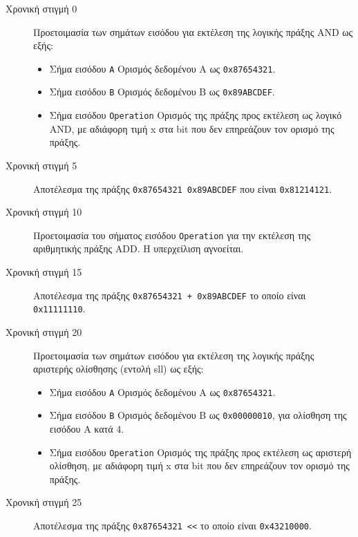 \documentclass[11pt]{extarticle}
\begin{document}
\begin{description}
\item[Χρονική στιγμή 0] \hfill \newline
Προετοιμασία των σημάτων εισόδου για εκτέλεση της λογικής πράξης AND ως εξής:
\begin{itemize}
    \item Σήμα εισόδου \texttt{Α} \newline Ορισμός δεδομένου Α ως \texttt{0x87654321}.
    \item Σήμα εισόδου \texttt{Β} \newline Ορισμός δεδομένου B ως \texttt{0x89ABCDEF}.
    \item Σήμα εισόδου \texttt{Operation} \newline Ορισμός της πράξης προς εκτέλεση ως λογικό AND, με αδιάφορη τιμή x στα bit που δεν επηρεάζουν τον ορισμό της πράξης.
\end{itemize}
\item[Χρονική στιγμή 5] \hfill \newline
Αποτέλεσμα της πράξης \texttt{0x87654321 \textampersand\space 0x89ABCDEF} που είναι \texttt{0x81214121}.
\item[Χρονική στιγμή 10] \hfill \newline
Προετοιμασία του σήματος εισόδου \texttt{Operation} για την εκτέλεση της αριθμητικής πράξης ADD. Η υπερχείλιση αγνοείται.
\item[Χρονική στιγμή 15] \hfill \newline
Αποτέλεσμα της πράξης \texttt{0x87654321 + 0x89ABCDEF} το οποίο είναι \texttt{0x11111110}.
\newpage
\item[Χρονική στιγμή 20] \hfill \newline
Προετοιμασία των σημάτων εισόδου για εκτέλεση της λογικής πράξης αριστερής ολίσθησης (εντολή sll) ως εξής:
\begin{itemize}
    \item Σήμα εισόδου \texttt{A} \newline Ορισμός δεδομένου A ως \texttt{0x87654321}.
    \item Σήμα εισόδου \texttt{B} \newline Ορισμός δεδομένου B ως \texttt{0x00000010}, για ολίσθηση της εισόδου A κατά 4.
    \item Σήμα εισόδου \texttt{Operation} \newline Ορισμός της πράξης προς εκτέλεση ως αριστερή ολίσθηση, με αδιάφορη τιμή x στα bit που δεν επηρεάζουν τον ορισμό της πράξης.
\end{itemize}
\item[Χρονική στιγμή 25] \hfill \newline
Αποτέλεσμα της πράξης \texttt{0x87654321 \textless\textless{}} το οποίο είναι \texttt{0x43210000}.
\end{description}
\end{document}
